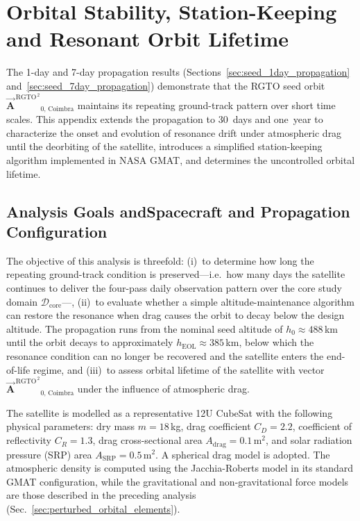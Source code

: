 \chapter{Orbital Stability, Station-Keeping and Resonant Orbit Lifetime}
\label{app:station_keeping}

The 1-day and 7-day propagation results (Sections~\ref{sec:seed_1day_propagation} and~\ref{sec:seed_7day_propagation}) demonstrate that the RGTO seed orbit $\vec{\mathbf{A}}^{\,\mathrm{RGTO}^{\,2}}{}_{0,\,\mathrm{Coimbra}}$ maintains its repeating ground-track pattern over short time scales.  This appendix extends the propagation to 30~days and one~year to characterize the onset and evolution of resonance drift under atmospheric drag until the deorbiting of the satellite, introduces a simplified station-keeping algorithm implemented in NASA GMAT, and determines the uncontrolled orbital lifetime.

\section{Analysis Goals andSpacecraft and Propagation Configuration}\label{sec:sk_spacecraft_config}

The objective of this analysis is threefold: (i)~to determine how long the repeating ground-track condition is preserved---i.e.\ how many days the satellite continues to deliver the four-pass daily observation pattern over the core study domain $\mathcal{D}_{\mathrm{core}}$---, (ii)~to evaluate whether a simple altitude-maintenance algorithm can restore the resonance when drag causes the orbit to decay below the design altitude.  The propagation runs from the nominal seed altitude of $h_0 \approx 488$\,km until the orbit decays to approximately $h_{\mathrm{EOL}} \approx 385$\,km, below which the resonance condition can no longer be recovered and the satellite enters the end-of-life regime, and (iii)~to assess orbital lifetime of the satellite with vector $\vec{\mathbf{A}}^{\,\mathrm{RGTO}^{\,2}}{}_{0,\,\mathrm{Coimbra}}$ under the influence of atmospheric drag.

The satellite is modelled as a representative 12U CubeSat with the following physical parameters: dry mass $m = 18$\,kg, drag coefficient $C_D = 2.2$, coefficient of reflectivity $C_R = 1.3$, drag cross-sectional area $A_{\mathrm{drag}} = 0.1$\,m$^2$, and solar radiation pressure (SRP) area $A_{\mathrm{SRP}} = 0.5$\,m$^2$.  A spherical drag model is adopted.  The atmospheric density is computed using the Jacchia-Roberts model in its standard GMAT configuration, while the gravitational and non-gravitational force models are those described in the preceding analysis (Sec.~\ref{sec:perturbed_orbital_elements}).

